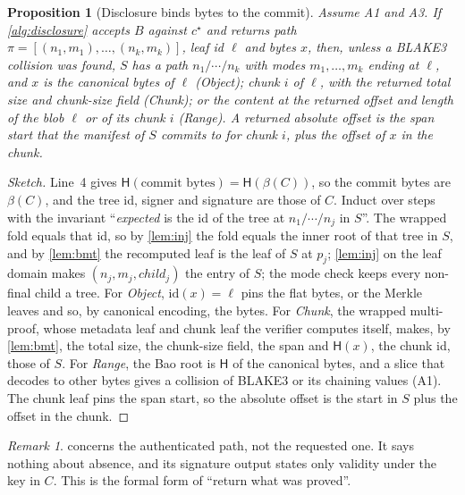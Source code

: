 \documentclass[10pt,letterpaper]{article}
\newtheorem{proposition}{Proposition}
\theoremstyle{remark}
\newtheorem{remark}{Remark}
\newcommand{\Hb}{\mathsf{H}}
\begin{document}
\begin{proposition}[Disclosure binds bytes to the commit]\label{prop:disclosure}
Assume A1 and A3. If \cref{alg:disclosure} accepts $B$ against $c^\star$ and
returns path $\pi = [(n_1, m_1), \ldots, (n_k, m_k)]$, leaf id $\ell$ and bytes
$x$, then, unless a BLAKE3 collision was found, $S$ has a path
$n_1/\cdots/n_k$ with modes $m_1, \ldots, m_k$ ending at $\ell$, and $x$ is the
canonical bytes of $\ell$ (\emph{Object}); chunk $i$ of $\ell$, with the
returned total size and chunk-size field (\emph{Chunk}); or the content at the
returned offset and length of the blob $\ell$ or of its chunk $i$
(\emph{Range}). A returned absolute offset is the span start that the manifest
of $S$ commits to for chunk $i$, plus the offset of $x$ in the chunk.
\end{proposition}
\begin{proof}[Sketch]
Line~4 gives $\Hb(\text{commit bytes}) = \Hb(\beta(C))$, so the commit bytes
are $\beta(C)$, and the tree id, signer and signature are those of $C$. Induct
over steps with the invariant ``\emph{expected} is the id of the tree at
$n_1/\cdots/n_j$ in $S$''. The wrapped fold equals that id, so by
\cref{lem:inj} the fold equals the inner root of that tree in $S$, and by
\cref{lem:bmt} the recomputed leaf is the leaf of $S$ at $p_j$; \cref{lem:inj} on the leaf domain
makes $(n_j, m_j, \mathit{child}_j)$ the entry of $S$; the mode check keeps
every non-final child a tree. For \emph{Object}, $\mathrm{id}(x) = \ell$ pins
the flat bytes, or the Merkle leaves and so, by canonical encoding, the bytes.
For \emph{Chunk}, the wrapped multi-proof, whose metadata leaf and chunk leaf
the verifier computes itself, makes, by \cref{lem:bmt}, the total size, the
chunk-size field, the span and $\Hb(x)$, the chunk id, those of $S$. For \emph{Range},
the Bao root is $\Hb$ of the canonical bytes, and a slice that decodes to other
bytes gives a collision of BLAKE3 or its chaining values (A1). The chunk leaf pins
the span start, so the absolute offset is the start in $S$ plus the offset in
the chunk.
\end{proof}

\begin{remark}
 concerns the authenticated path, not the requested one.
It says nothing about absence, and its signature output states only validity
under the key in $C$. This is the formal form of ``return what was proved''.
\end{remark}
\end{document}
